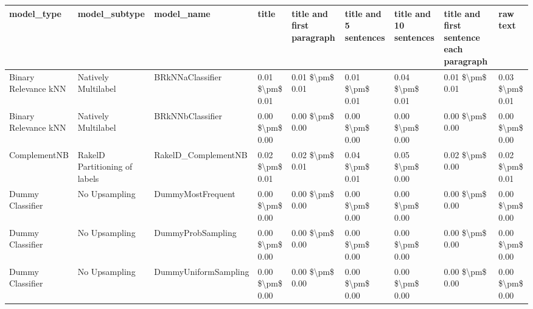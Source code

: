 \begin{tabular}{lllllllll}
\toprule
                     model\_type &                 model\_subtype &                                   model\_name &           title & title and first paragraph & title and 5 sentences & title and 10 sentences & title and first sentence each paragraph &            raw text \\
\midrule
           Binary Relevance kNN &           Natively Multilabel &                             BRkNNaClassifier & 0.01 \$\textbackslash pm\$ 0.01 &           0.01 \$\textbackslash pm\$ 0.01 &       0.01 \$\textbackslash pm\$ 0.01 &        0.04 \$\textbackslash pm\$ 0.01 &                         0.01 \$\textbackslash pm\$ 0.01 &     0.03 \$\textbackslash pm\$ 0.01 \\
           Binary Relevance kNN &           Natively Multilabel &                             BRkNNbClassifier & 0.00 \$\textbackslash pm\$ 0.00 &           0.00 \$\textbackslash pm\$ 0.00 &       0.00 \$\textbackslash pm\$ 0.00 &        0.00 \$\textbackslash pm\$ 0.00 &                         0.00 \$\textbackslash pm\$ 0.00 &     0.00 \$\textbackslash pm\$ 0.00 \\
                   ComplementNB & RakelD Partitioning of labels &                          RakelD\_ComplementNB & 0.02 \$\textbackslash pm\$ 0.01 &           0.02 \$\textbackslash pm\$ 0.01 &       0.04 \$\textbackslash pm\$ 0.01 &        0.05 \$\textbackslash pm\$ 0.00 &                         0.02 \$\textbackslash pm\$ 0.00 &     0.02 \$\textbackslash pm\$ 0.01 \\
               Dummy Classifier &                 No Upsampling &                            DummyMostFrequent & 0.00 \$\textbackslash pm\$ 0.00 &           0.00 \$\textbackslash pm\$ 0.00 &       0.00 \$\textbackslash pm\$ 0.00 &        0.00 \$\textbackslash pm\$ 0.00 &                         0.00 \$\textbackslash pm\$ 0.00 &     0.00 \$\textbackslash pm\$ 0.00 \\
               Dummy Classifier &                 No Upsampling &                            DummyProbSampling & 0.00 \$\textbackslash pm\$ 0.00 &           0.00 \$\textbackslash pm\$ 0.00 &       0.00 \$\textbackslash pm\$ 0.00 &        0.00 \$\textbackslash pm\$ 0.00 &                         0.00 \$\textbackslash pm\$ 0.00 &     0.00 \$\textbackslash pm\$ 0.00 \\
               Dummy Classifier &                 No Upsampling &                         DummyUniformSampling & 0.00 \$\textbackslash pm\$ 0.00 &           0.00 \$\textbackslash pm\$ 0.00 &       0.00 \$\textbackslash pm\$ 0.00 &        0.00 \$\textbackslash pm\$ 0.00 &                         0.00 \$\textbackslash pm\$ 0.00 &     0.00 \$\textbackslash pm\$ 0.00 \\

\end{tabular}
